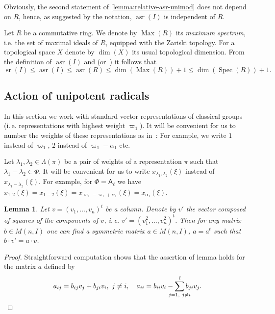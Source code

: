 \documentclass[11pt]{amsart}
\theoremstyle{plain}
\numberwithin{equation}{section}
\newtheorem{lemma}{Lemma}
\numberwithin{lemma}{section}
\theoremstyle{definition}
\theoremstyle{remark}
\DeclareMathOperator{\sr}{sr}
\DeclareMathOperator{\asr}{asr}
\DeclareMathOperator{\Max}{Max}
\DeclareMathOperator{\Spec}{Spec}
\newcommand{\rA}{\mathsf{A}}
\begin{document}
Obviously, the second statement of \cref{lemma:relative-asr-unimod} does not depend on $R$, hence, as suggested by the notation, $\asr(I)$ is independent of $R$.

Let $R$ be a commutative ring. We denote by $\Max(R)$ its \emph{maximum spectrum}, i.e. the set of maximal ideals of $R$, equipped with the Zariski topology. For a topological space $X$ denote by $\dim(X)$ its usual topological dimension.
From the definition of $\asr(I)$ and \cite[Theorem~2.3]{EO} (or~\cite[Theorem~3.7]{MKV}) it follows that
\begin{equation} \label{sr-estimates} \sr(I)\leqslant\asr(I)\leqslant\asr(R)\leqslant \dim(\Max(R))+1\leqslant\dim(\Spec(R))+1. \end{equation}

\subsection{Action of unipotent radicals}\label{sec:ur-action}

In this section we work with standard vector representations of classical groups (i.\,e. representations with highest weight $\varpi_1$).
It will be convenient for us to number the weights of these representations as in~\cite[\S~1B]{St78}:
For example, we write $1$ instead of $\varpi_1$, $2$ instead of $\varpi_1-\alpha_1$ etc.

Let $\lambda_1, \lambda_2 \in \Lambda(\pi)$ be a pair of weights of a representation $\pi$ such that $\lambda_1-\lambda_2\in \Phi$.
It will be convenient for us to write $x_{\lambda_1, \lambda_2}(\xi)$ instead of $x_{\lambda_1-\lambda_2}(\xi)$.
For example, for $\Phi=\rA_\ell$ we have $x_{1, 2}(\xi)=x_{1-2}(\xi)=x_{\varpi_1 - \varpi_1 + \alpha_1}(\xi) = x_{\alpha_1}(\xi)$.

\begin{lemma}\label{lemma:PSV-symplectic-trick}
 Let $v=(v_1, \ldots, v_n)^t$ be a column. Denote by $v'$ the vector composed of squares of the components of $v$, i.\,e. $v'=(v_1^2, \ldots, v_n^2)^t$.
 Then for any matrix $b \in M(n, I)$ one can find a symmetric matrix $a \in M(n, I)$, $a=a^t$ such that $b \cdot v' = a \cdot v$. \end{lemma}
\begin{proof}
Straightforward computation shows that the assertion of lemma holds for the matrix $a$ defined by
\begin{equation*}
a_{ij} = b_{ij} v_{j} + b_{ji} v_{i},\ j\neq i,\quad a_{ii} = b_{ii} v_{i} - \sum\limits_{\mathclap{j=1,\ j\neq i}}^\ell b_{ji} v_{j}. \qedhere
\end{equation*}
\end{proof}
\end{document}
